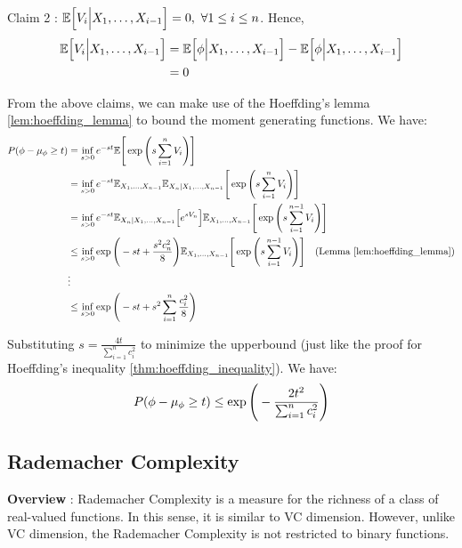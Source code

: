 \begin{proof*}
\begin{subproof}{\newline Claim 2 : $\mathbb{E}\Big[  V_i\Big| X_1, \dots, X_{i-1}  \Big] = 0, \ \forall 1 \le i \le n$.}
        \noindent Hence, 
        \begin{align*}
            \mathbb{E}\Big[  V_i\Big| X_1, \dots, X_{i-1}  \Big] &= \mathbb{E}\Big[ \phi\Big|X_1, \dots, X_{i-1} \Big] - \mathbb{E}\Big[ \phi\Big|X_1, \dots, X_{i-1} \Big] \\ &=0
        \end{align*}
    \end{subproof}

    \noindent From the above claims, we can make use of the Hoeffding's lemma \ref{lem:hoeffding_lemma} to bound the moment generating functions. We have:
    \begin{align*}
        P(\phi - \mu_\phi \ge t) 
        &= \inf_{s>0}e^{-st}\mathbb{E}\Bigg[ 
            \exp\Bigg( 
                s\sum_{i=1}^n V_i
             \Bigg)
         \Bigg] \\
        &= \inf_{s>0}e^{-st}\mathbb{E}_{X_1, \dots, X_{n-1}}\mathbb{E}_{X_n|X_1, \dots, X_{n-1}}\Bigg[ 
            \exp\Bigg( 
                s\sum_{i=1}^n V_i
             \Bigg)
         \Bigg] \\
        &= \inf_{s>0}e^{-st}\mathbb{E}_{X_n|X_1, \dots, X_{n-1}}\Big[ e^{sV_n} \Big]\mathbb{E}_{X_1, \dots, X_{n-1}}\Bigg[ 
            \exp\Bigg( 
                s\sum_{i=1}^{n-1} V_i
             \Bigg)
         \Bigg]\\
        &\le \inf_{s>0}\exp\Bigg( 
            -st + \frac{s^2c_n^2}{8}
         \Bigg)\mathbb{E}_{X_1, \dots, X_{n-1}}\Bigg[ 
            \exp\Bigg( 
                s\sum_{i=1}^{n-1} V_i
             \Bigg)
         \Bigg]  \ \ \ \text{(Lemma \ref{lem:hoeffding_lemma})} \\
        &\vdots \\
        &\le \inf_{s>0}\exp\Bigg( 
            -st + s^2 \sum_{i=1}^n \frac{c_i^2}{8}
         \Bigg)
    \end{align*}

    \noindent Substituting $s=\frac{4t}{\sum_{i=1}^n c_i^2}$ to minimize the upperbound (just like the proof for Hoeffding's inequality \ref{thm:hoeffding_inequality}). We have:
    \begin{align*}
        P(\phi - \mu_\phi \ge t) \le \exp\Bigg( 
            -\frac{2t^2}{\sum_{i=1}^n c_i^2}
         \Bigg)
    \end{align*}
\end{proof*}

\subsection{Rademacher Complexity}
\textbf{Overview} : Rademacher Complexity is a measure for the richness of a class of real-valued functions. In this sense, it is similar to VC dimension. However, unlike VC dimension, the Rademacher Complexity is not restricted to binary functions.

